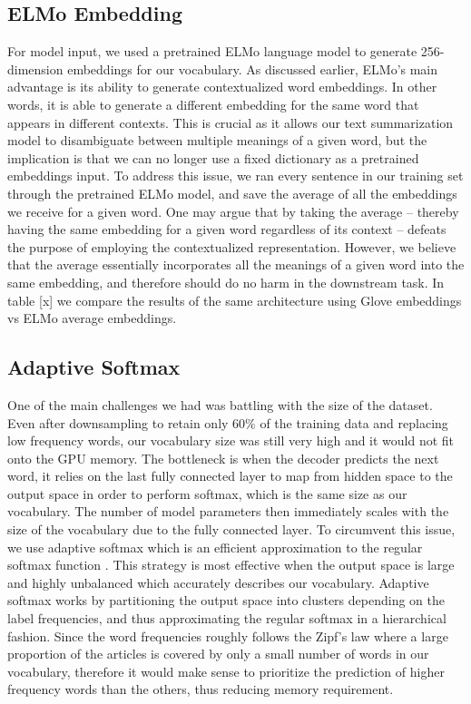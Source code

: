 \subsection{ELMo Embedding}
For model input, we used a pretrained ELMo language model \cite{peters2018deep} to generate 256-dimension embeddings for our vocabulary. As discussed earlier, ELMo's main advantage is its ability to generate contextualized word embeddings. In other words, it is able to generate a different embedding for the same word that appears in different contexts. This is crucial as it allows our text summarization model to disambiguate between multiple meanings of a given word, but the implication is that we can no longer use a fixed dictionary as a pretrained embeddings input. To address this issue, we ran every sentence in our training set through the pretrained ELMo model, and save the average of all the embeddings we receive for a given word. One may argue that by taking the average -- thereby having the same embedding for a given word regardless of its context -- defeats the purpose of employing the contextualized representation. However, we believe that the average essentially incorporates all the meanings of a given word into the same embedding, and therefore should do no harm in the downstream task.  In table [x]  we compare the results of the same architecture using Glove embeddings vs ELMo average embeddings. 

\subsection{Adaptive Softmax}
One of the main challenges we had was battling with the size of the dataset. Even after downsampling to retain only $60\%$ of the training data and replacing low frequency words, our vocabulary size was still very high and it would not fit onto the GPU memory. The bottleneck is when the decoder predicts the next word, it relies on the last fully connected layer to map from hidden space to the output space in order to perform softmax, which is the same size as our vocabulary. The number of model parameters then immediately scales with the size of the vocabulary due to the fully connected layer. To circumvent this issue, we use adaptive softmax which is an efficient approximation to the regular softmax function \cite{grave2016efficient}. This strategy is most effective when the output space is large and highly unbalanced which accurately describes our vocabulary. Adaptive softmax works by partitioning the output space into clusters depending on the label frequencies, and thus approximating the regular softmax in a hierarchical fashion. Since the word frequencies roughly follows the Zipf's law \cite{wilson1949human} where a large proportion of the articles is covered by only a small number of words in our vocabulary, therefore it would make sense to prioritize the prediction of higher frequency words than the others, thus reducing memory requirement.


